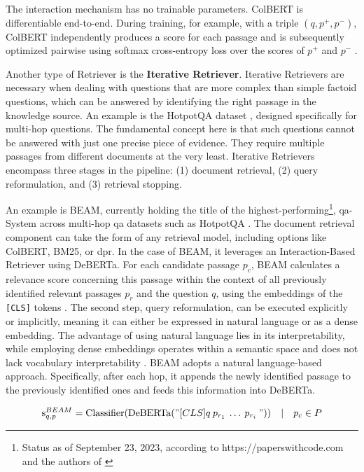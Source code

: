 The interaction mechanism has no trainable parameters. ColBERT is differentiable end-to-end. During training, for example, with a triple $(q, p^+, p^-)$, ColBERT independently produces a score for each passage and is subsequently optimized pairwise using softmax cross-entropy loss over the scores of $p^+$ and $p^-$ \cite{khattab_colbert_2020}.

Another type of Retriever is the \textbf{Iterative Retriever}. Iterative Retrievers are necessary when dealing with questions that are more complex than simple factoid questions, which can be answered by identifying the right passage in the knowledge source. An example is the HotpotQA dataset \cite{yang_hotpotqa_2018}, designed specifically for multi-hop questions. The fundamental concept here is that such questions cannot be answered with just one precise piece of evidence. They require multiple passages from different documents at the very least. Iterative Retrievers encompass three stages in the pipeline: (1) document retrieval, (2) query reformulation, and (3) retrieval stopping.

An example is BEAM, currently holding the title of the highest-performing\footnote{Status as of September 23, 2023, according to https://paperswithcode.com and the authors of \cite{zhang_beam_2023}}, \gls{qa}-System across multi-hop \gls{qa} datasets such as HotpotQA \cite{zhang_beam_2023}. The document retrieval component can take the form of any retrieval model, including options like ColBERT, BM25, or \gls{dpr}. In the case of BEAM, it leverages an Interaction-Based Retriever using DeBERTa. For each candidate passage $p_c$, BEAM calculates a relevance score concerning this passage within the context of all previously identified relevant passages $p_r$ and the question $q$, using the embeddings of the \verb|[CLS]| tokens \cite{he_deberta_2020}. The second step, query reformulation, can be executed explicitly or implicitly, meaning it can either be expressed in natural language or as a dense embedding. The advantage of using natural language lies in its interpretability, while employing dense embeddings operates within a semantic space and does not lack vocabulary interpretability \cite{zhu_retrieving_2021}. BEAM adopts a natural language-based approach. Specifically, after each hop, it appends the newly identified passage to the previously identified ones and feeds this information into DeBERTa.

\begin{equation}
    \text{s}_{q, p}^{BEAM} = \text{Classifier}(\text{DeBERTa}("[CLS] q \: p_{r_1} \: \ldots \: p_{r_i} \: ")) \quad | \quad p_{c} \in P
\end{equation}

